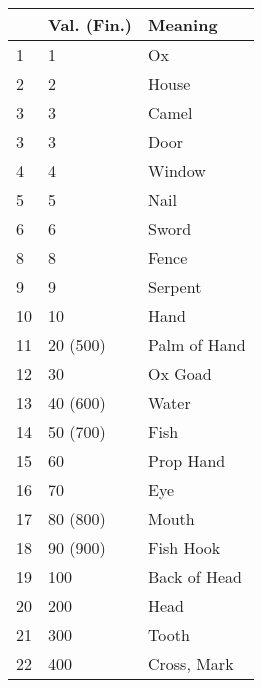 \addchap{}
\begin{center}
\large
  \begin{tabular}{ l | l | l }
    \-\ & Val. (Fin.) & Meaning \\ \hline
    1   & 1           & Ox \\ \hline
    2   & 2           & House \\ \hline
    3   & 3           & Camel \\ \hline
    3   & 3           & Door \\ \hline
    4   & 4           & Window \\ \hline
    5   & 5           & Nail \\ \hline
    6   & 6           & Sword \\ \hline
    8   & 8           & Fence \\ \hline
    9   & 9           & Serpent \\ \hline
    10  & 10          & Hand \\ \hline
    11  & 20 (500)    & Palm of Hand \\ \hline
    12  & 30          & Ox Goad \\ \hline
    13  & 40 (600)    & Water \\ \hline
    14  & 50 (700)    & Fish \\ \hline
    15  & 60          & Prop Hand \\ \hline
    16  & 70          & Eye \\ \hline
    17  & 80 (800)    & Mouth \\ \hline
    18  & 90 (900)    & Fish Hook \\ \hline
    19  & 100         & Back of Head \\ \hline
    20  & 200         & Head \\ \hline
    21  & 300         & Tooth \\ \hline
    22  & 400         & Cross, Mark \\
  \end{tabular}
\end{center}
